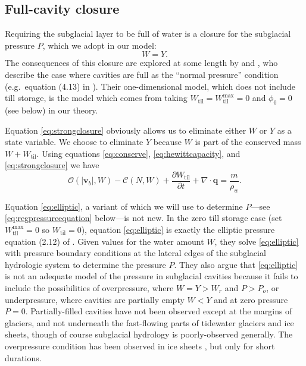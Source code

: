 \documentclass[gmd]{copernicus}   %
\newcommand{\text}{\textrm}
\newcommand\bv{\mathbf{v}}
\newcommand\bq{\mathbf{q}}
\newcommand{\ddt}[1]{\ensuremath{\frac{\partial #1}{\partial t}}}
\newcommand{\Div}{\nabla\cdot}
\newcommand{\Wtil}{W_{\text{til}}}
\newcommand{\Wtilmax}{W_{\text{til}}^{\text{max}}}
\begin{document}
\subsection{Full-cavity closure}  Requiring the subglacial layer to be full of water is a closure for the subglacial pressure $P$, which we adopt in our model:
\begin{equation}
W = Y.\label{eq:strongclosure}
\end{equation}
The consequences of this closure are explored at some length by \cite{Schoofetal2012} and \cite{Hewittetal2012}, who describe the case where cavities are full as the ``normal pressure'' condition (e.g.~equation (4.13) in \cite{Schoofetal2012}).  Their one-dimensional model, which does not include till storage, is the model which comes from taking $\Wtil=\Wtilmax=0$ and $\phi_0=0$ (see below) in our theory.

Equation \eqref{eq:strongclosure} obviously allows us to eliminate either $W$ or $Y$ as a state variable.  We choose to eliminate $Y$ because $W$ is part of the conserved mass $W + \Wtil$.  Using equations \eqref{eq:conserve}, \eqref{eq:hewittcapacity}, and \eqref{eq:strongclosure} we have
\begin{equation}
\mathcal{O}(|\bv_b|,W) - \mathcal{C}(N,W) + \ddt{\Wtil} + \Div\bq = \frac{m}{\rho_w}. \label{eq:elliptic}
\end{equation}

Equation \eqref{eq:elliptic}, a variant of which we will use to determine $P$---see \eqref{eq:regpressureequation} below---is not new.  In the zero till storage case (set $\Wtilmax=0$ so $\Wtil=0$), equation \eqref{eq:elliptic} is exactly the elliptic pressure equation (2.12) of \cite{Schoofetal2012}.  Given values for the water amount $W$, they solve \eqref{eq:elliptic} with pressure boundary conditions at the lateral edges of the subglacial hydrologic system to determine the pressure $P$.  They also argue that \eqref{eq:elliptic} is not an adequate model of the pressure in subglacial cavities because it fails to include the possibilities of overpressure, where $W=Y>W_r$ and $P>P_o$, or underpressure, where cavities are partially empty $W<Y$ and at zero pressure $P=0$.  Partially-filled cavities have not been observed except at the margins of glaciers, and not underneath the fast-flowing parts of tidewater glaciers and ice sheets, though of course subglacial hydrology is poorly-observed generally.  The overpressure condition has been observed in ice sheets \citep[for example]{Dasetal08}, but only for short durations.
\end{document}
